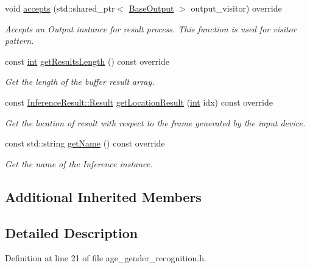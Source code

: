 \begin{DoxyCompactItemize}
void \hyperlink{classopenvino__service_1_1AgeGenderDetection_a15e5859bb5805fb36696d1e25db91915}{accepts} (std\+::shared\+\_\+ptr$<$ \hyperlink{classBaseOutput}{Base\+Output} $>$ output\+\_\+visitor) override
\begin{DoxyCompactList}\small\item\em Accepts an Output instance for result process. This function is used for visitor pattern. \end{DoxyCompactList}\item 
const \hyperlink{CMakeCache_8txt_a79a3d8790b2588b09777910863574e09}{int} \hyperlink{classopenvino__service_1_1AgeGenderDetection_a61f978e7e856ec5a16867ad0ed1d5180}{get\+Results\+Length} () const override
\begin{DoxyCompactList}\small\item\em Get the length of the buffer result array. \end{DoxyCompactList}\item 
const \hyperlink{structInferenceResult_1_1Result}{Inference\+Result\+::\+Result} \hyperlink{classopenvino__service_1_1AgeGenderDetection_a99ffe0dd90910e5a5df8dc3db24d9dac}{get\+Location\+Result} (\hyperlink{CMakeCache_8txt_a79a3d8790b2588b09777910863574e09}{int} idx) const override
\begin{DoxyCompactList}\small\item\em Get the location of result with respect to the frame generated by the input device. \end{DoxyCompactList}\item 
const std\+::string \hyperlink{classopenvino__service_1_1AgeGenderDetection_a3a0189c3329c9319357cc23c7ee0133f}{get\+Name} () const override
\begin{DoxyCompactList}\small\item\em Get the name of the Inference instance. \end{DoxyCompactList}\end{DoxyCompactItemize}
\subsection*{Additional Inherited Members}


\subsection{Detailed Description}


Definition at line 21 of file age\+\_\+gender\+\_\+recognition.\+h.



